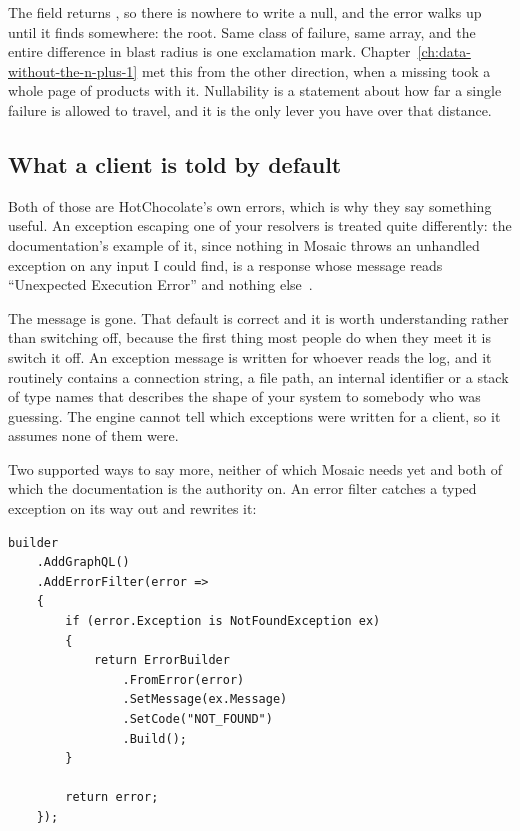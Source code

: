 The field returns , so there is nowhere to write a
null, and the error walks up until it finds somewhere: the root. Same class of
failure, same array, and the entire difference in blast radius is one
exclamation mark. Chapter~\ref{ch:data-without-the-n-plus-1} met this from the
other direction, when a missing  took a whole page of products
with it. Nullability is a statement about how far a single failure is allowed
to travel, and it is the only lever you have over that distance.

\subsection*{What a client is told by default}

%
Both of those are HotChocolate's own errors, which is why they say something
useful. An exception escaping one of your resolvers is treated quite
differently: the documentation's example of it, since nothing in Mosaic throws
an unhandled exception on any input I could find, is a response whose message
reads \enquote{Unexpected Execution Error} and nothing
else~\autocite{chillicream2026errors}.

The message is gone. That default is correct and
it is worth understanding rather than switching off, because the first thing
most people do when they meet it is switch it off. An exception message is
written for whoever reads the log, and it routinely contains a connection
string, a file path, an internal identifier or a stack of type names that
describes the shape of your system to somebody who was guessing. The engine
cannot tell which exceptions were written for a client, so it assumes none of
them were.

%
Two supported ways to say more, neither of which Mosaic needs yet and both of
which the documentation is the authority on. An error filter catches a typed
exception on its way out and rewrites it:

\begin{verbatim}
builder
    .AddGraphQL()
    .AddErrorFilter(error =>
    {
        if (error.Exception is NotFoundException ex)
        {
            return ErrorBuilder
                .FromError(error)
                .SetMessage(ex.Message)
                .SetCode("NOT_FOUND")
                .Build();
        }

        return error;
    });
\end{verbatim}

